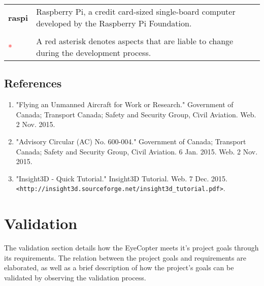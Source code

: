 \documentclass[10pt,letterpaper]{article}
\begin{document}
\begin{table}[ht]
\begin{center}
{\begin{tabular}{p{4cm} p{8.5cm}}
        \textbf{raspi} & Raspberry Pi, a credit card-sized single-board computer developed by the Raspberry Pi Foundation. \\ \\

        \textcolor{red}{*} & A red asterisk denotes aspects that are liable to change during the development process.

    \end{tabular}}
  \end{center}
\end{table}


\newpage


\subsection{References}
\begin{enumerate}
	\item "Flying an Unmanned Aircraft for Work or Research." Government of Canada; Transport Canada; Safety and Security Group, Civil Aviation. Web. 2 Nov. 2015.
	\item "Advisory Circular (AC) No. 600-004." Government of Canada; Transport Canada; Safety and Security Group, Civil Aviation. 6 Jan. 2015. Web. 2 Nov. 2015.
    \item "Insight3D - Quick Tutorial." Insight3D Tutorial. Web. 7 Dec. 2015. \texttt{<http://insight3d.sourceforge.net/insight3d\_tutorial.pdf>}.
\end{enumerate}


\newpage


\section{Validation}
The validation section details how the EyeCopter meets it's project goals through its requirements. The relation between the project goals and requirements are elaborated, as well as a brief description of how the project's goals can be validated by observing the validation process.
\end{document}
